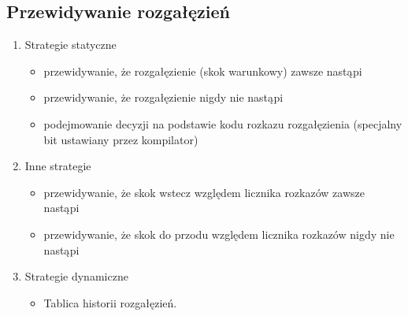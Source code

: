     	\subsection*{Przewidywanie rozgałęzień}
    	\begin{enumerate}
    		\item Strategie statyczne
    		\begin{itemize}
    			\item przewidywanie, że rozgałęzienie (skok warunkowy) zawsze nastąpi
    			\item przewidywanie, że rozgałęzienie nigdy nie nastąpi
    			\item podejmowanie decyzji na podstawie kodu rozkazu rozgałęzienia (specjalny bit ustawiany przez kompilator)
    		\end{itemize}
    		\item Inne strategie
    		\begin{itemize}
    			\item przewidywanie, że skok wstecz względem licznika rozkazów zawsze nastąpi
    			\item przewidywanie, że skok do przodu względem licznika rozkazów nigdy nie nastąpi
    		\end{itemize}
    		\item Strategie dynamiczne
    		\begin{itemize}
    			\item Tablica historii rozgałęzień.
    		\end{itemize}

\end{enumerate}
